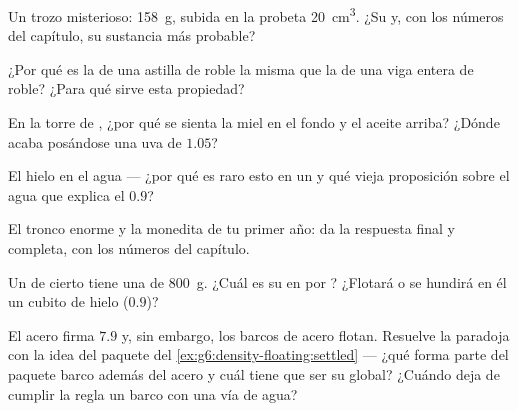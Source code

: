 \begin{exercise}[$\star$]\label{exo:g6:density-floating:4}
Un trozo misterioso:  \qty{158}{g}, subida en la probeta
\qty{20}{cm^3}. ¿Su  y, con los números del capítulo, su
sustancia más probable?
\end{exercise}

\begin{exercise}[$\star$]\label{exo:g6:density-floating:5}
¿Por qué es la  de una astilla de roble la misma que la de
una viga entera de roble? ¿Para qué sirve esta propiedad?
\end{exercise}

\begin{exercise}[$\star$]\label{exo:g6:density-floating:6}
En la torre de , ¿por qué se sienta la miel en el fondo y el
aceite arriba? ¿Dónde acaba posándose una uva de  $1.05$?
\end{exercise}

\begin{exercise}[$\star$]\label{exo:g6:density-floating:7}
El hielo  en el agua --- ¿por qué es raro esto en un
 y qué vieja proposición sobre el agua que  explica
el $0.9$?
\end{exercise}

\begin{exercise}[$\star$]\label{exo:g6:density-floating:8}
El tronco enorme y la monedita de tu primer año: da la respuesta
final y completa, con los números del capítulo.
\end{exercise}

\begin{exercise}[$\star\star$]\label{exo:g6:density-floating:9}
Un  de cierto  tiene una  de \qty{800}{g}.
¿Cuál es su  en  por ?
¿Flotará o se hundirá en él un cubito de hielo ($0.9$)?
\end{exercise}

\begin{exercise}[$\star\star$]\label{exo:g6:density-floating:10}
El acero firma $7.9$ y, sin embargo, los barcos de acero flotan.
Resuelve la paradoja con la idea del paquete del
\cref{ex:g6:density-floating:settled} --- ¿qué forma parte del paquete
barco además del acero y cuál tiene que ser su  global?
¿Cuándo deja de cumplir la regla un barco con una vía de agua?
\end{exercise}

